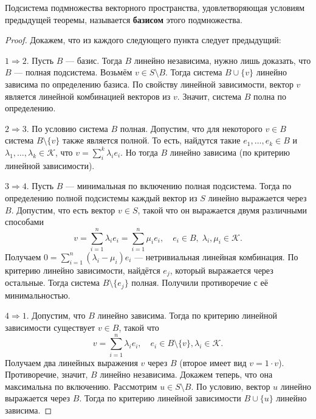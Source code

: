 \begin{definition}
    Подсистема подмножества векторного пространства, удовлетворяющая условиям предыдущей теоремы, называется \textbf{базисом} этого подмножества.
\end{definition}

\begin{proof}
    Докажем, что из каждого следующего пункта следует предыдущий:

    $1 \Rightarrow 2$. Пусть $B$ --- базис. Тогда $B$ линейно независима, нужно лишь доказать, что $B$ --- полная подсистема. Возьмём $v \in S \setminus B$. Тогда система $B \cup \{v\}$ линейно зависима по определению базиса. По свойству линейной зависимости, вектор $v$ является линейной комбинацией векторов из $v$. Значит, система $B$ полна по определению.

    $2 \Rightarrow 3$. По условию система $B$ полная. Допустим, что для некоторого $v \in B$ система $B \setminus \{v\}$ также является полной. То есть, найдутся такие $e_1, \ldots, e_k \in B$ и $\lambda_1, \ldots, \lambda_k \in \mathcal{K}$, что $v = \sum_i^k\lambda_ie_i$. Но тогда $B$ линейно зависима (по критерию линейной зависимости).

    $3 \Rightarrow 4$. Пусть $B$ --- минимальная по включению полная подсистема. Тогда по определению полной подсистемы каждый вектор из $S$ линейно выражается через $B$. Допустим, что есть вектор $v \in S$, такой что он выражается двумя различными способами
    $$
    v = \sum_{i = 1}^n\lambda_ie_i = \sum_{i = 1}^n\mu_ie_i,\quad e_i \in B,\;\lambda_i,\mu_i \in \mathcal{K}.
    $$
    Получаем $\displaystyle 0 = \sum_{i = 1}^n(\lambda_i - \mu_i)e_i$ --- нетривиальная линейная комбинация. По критерию линейно зависимости, найдётся $e_j$, который выражается через остальные. Тогда система $B \setminus \{e_j\}$ полная. Получили противоречие с её минимальностью.

    $4 \Rightarrow 1$. Допустим, что $B$ линейно зависима. Тогда по критерию линейной зависимости существует $v \in B$, такой что
    $$
    v = \sum_{i = 1}^n\lambda_ie_i,\quad e_i \in B \setminus \{v\}, \lambda_i \in \mathcal{K}.
    $$
    Получаем два линейных выражения $v$ через $B$ (второе имеет вид $v = 1 \cdot v$). Противоречие, значит, $B$ линейно независима. Докажем теперь, что она максимальна по включению. Рассмотрим $u \in S \setminus B$. По условию, вектор $u$ линейно выражается через $B$. Тогда по критерию линейной зависимости $B \cup \{u\}$ линейно зависима.
\end{proof}

